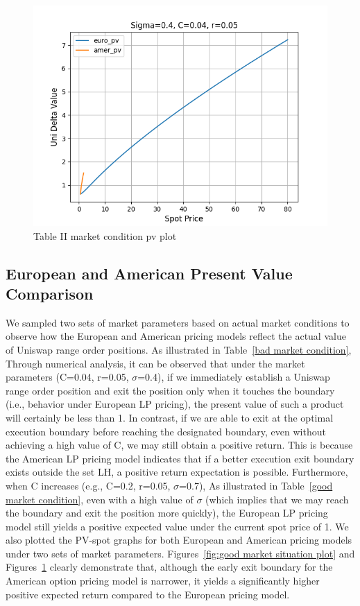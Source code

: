 \documentclass[conference]{IEEEtran}
\begin{document}
\begin{figure}
    \centering
    \includegraphics[width=1\linewidth]{figures/bad-market-situation-plot.png}
    \caption{Table II market condition pv plot}
    \label{fig:bad market situation plot}
\end{figure}



\subsection{European and American Present Value Comparison}
We sampled two sets of market parameters based on actual market conditions to observe how the European and American pricing models reflect the actual value of Uniswap range order positions. As illustrated in Table~\ref{bad market condition}, Through numerical analysis, it can be observed that under the market parameters (C=0.04, r=0.05, $\sigma$=0.4), if we immediately establish a Uniswap range order position and exit the position only when it touches the boundary (i.e., behavior under European LP pricing), the present value of such a product will certainly be less than 1. In contrast, if we are able to exit at the optimal execution boundary before reaching the designated boundary, even without achieving a high value of C, we may still obtain a positive return. This is because the American LP pricing model indicates that if a better execution exit boundary exists outside the set LH, a positive return expectation is possible. Furthermore, when C increases (e.g., C=0.2, r=0.05, $\sigma$=0.7), As illustrated in Table~\ref{good market condition}, even with a high value of $\sigma$ (which implies that we may reach the boundary and exit the position more quickly), the European LP pricing model still yields a positive expected value under the current spot price of 1. 
We also plotted the PV-spot graphs for both European and American pricing models under two sets of market parameters. Figures~\ref{fig:good market situation plot} and Figures~\ref{fig:bad market situation plot} clearly demonstrate that, although the early exit boundary for the American option pricing model is narrower, it yields a significantly higher positive expected return compared to the European pricing model.
\end{document}
